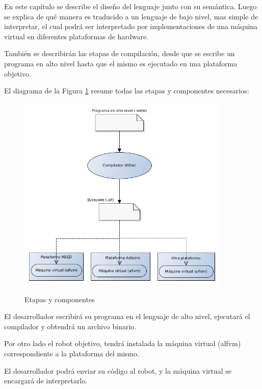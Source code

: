 
  En este capítulo se describe el diseño del lenguaje junto con su semántica.
Luego se explica de qué manera es traducido a un lenguaje de bajo nivel, mas
simple de interpretar, el cual podrá ser interpretado por implementaciones de
una máquina virtual en diferentes plataformas de hardware.

  También se describirán las etapas de compilación, desde que se escribe
un programa en alto nivel hasta que el mismo es ejecutado en una
plataforma objetivo.

  El diagrama de la Figura \ref{fig:compilacion} resume todas las etapas y
componentes necesarios:

\begin{figure}[h]
\begin{center}
\caption{Etapas y componentes}
\includegraphics[width=0.9\textwidth]{graphs/compilacion.png}
\label{fig:compilacion}
\end{center}
\end{figure}

  El desarrollador escribirá su programa en el lenguaje \frob{} de alto
nivel, ejecutará el compilador y obtendrá un archivo \alf{} binario.

  Por otro lado el robot objetivo, tendrá instalada la máquina
virtual (alfvm) correspondiente a la plataforma del mismo.

  El desarrollador podrá enviar su código \alf{} al robot, y la máquina
virtual se encargará de interpretarlo.


